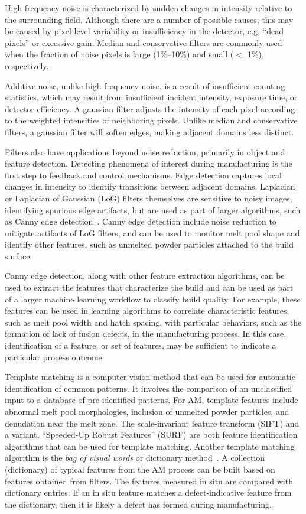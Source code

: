 High frequency noise is characterized by sudden changes in intensity relative to the surrounding field. Although there are a number of possible causes, this may be caused by pixel-level variability or insufficiency in the detector, e.g. ``dead pixels'' or excessive gain. Median and conservative filters are commonly used when the fraction of noise pixels is large (1\%--10\%) and small ($<$ 1\%), respectively.

Additive noise, unlike high frequency noise, is a result of insufficient counting statistics, which may result from insufficient incident intensity, exposure time, or detector efficiency. A gaussian filter adjusts the intensity of each pixel according to the weighted intensities of neighboring pixels. Unlike median and conservative filters, a gaussian filter will soften edges, making adjacent domains less distinct.

Filters also have applications beyond noise reduction, primarily in object and feature detection. Detecting phenomena of interest during manufacturing is the first step to feedback and control mechanisms. Edge detection captures local changes in intensity to identify transitions between adjacent domains. Laplacian or Laplacian of Gaussian (LoG) filters themselves are sensitive to noisy images, identifying spurious edge artifacts, but are used as part of larger algorithms, such as Canny edge detection~\cite{Canny1986}. Canny edge detection include noise reduction to mitigate artifacts of LoG filters, and can be used to monitor melt pool shape and identify other features, such as unmelted powder particles attached to the build surface.

Canny edge detection, along with other feature extraction algorithms, can be used to extract the features that characterize the build and can be used as part of a larger machine learning workflow to classify build quality. For example, these features can be used in learning algorithms to correlate characteristic features, such as melt pool width and hatch spacing, with particular behaviors, such as the formation of lack of fusion defects, in the manufacturing process. In this case, identification of a feature, or set of features, may be sufficient to indicate a particular process outcome.

Template matching is a computer vision method that can be used for automatic identification of common patterns. It involves the comparison of an unclassified input to a database of pre-identified patterns. For AM, template features include abnormal melt pool morphologies, inclusion of unmelted powder particles, and denudation near the melt zone. The scale-invariant feature transform (SIFT) \cite{Lowe2004} and a variant, ``Speeded-Up Robust Features'' (SURF) \cite{Bay2008} are both feature identification algorithms that can be used for template matching. Another template matching algorithm is the \textit{bag of visual words} or dictionary method~\cite{DeCost2015}. A collection (dictionary) of typical features from the AM process can be built based on features obtained from filters. The features measured in situ are compared with dictionary entries. If an in situ feature matches a defect-indicative feature from the dictionary, then it is likely a defect has formed during manufacturing.

